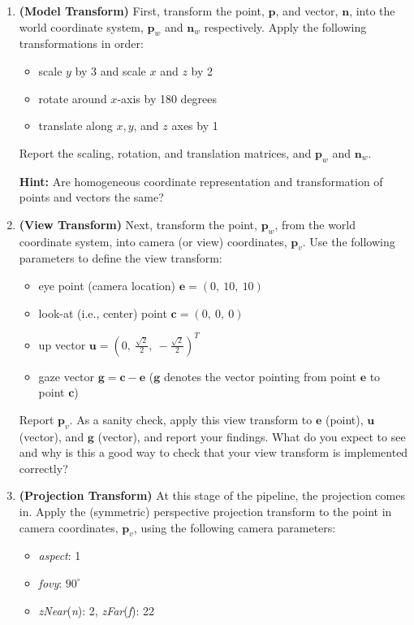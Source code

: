 \documentclass[conference]{styles/acmsiggraph}
\renewcommand{\vec}[1]{\mathbf{#1}}
\newcommand{\pointsin}[1]{\normalfont{(\textit{#1pts})}}
\begin{document}
\begin{enumerate}[label=(\roman*)]
	\itemsep1em 
	\item \textbf{(Model Transform)} First, transform the point, $\vec{p}$, and vector, $\vec{n}$, into the world coordinate system, $\vec{p}_{w}$ and $\vec{n}_{w}$ respectively. Apply the following transformations in order:
	\begin{itemize}
		\item scale $y$ by 3 and scale $x$ and $z$ by 2
		\item rotate around $x$-axis by 180 degrees
		\item translate along $x, y$, and $z$ axes by 1
	\end{itemize}
	Report the scaling, rotation, and translation matrices, and $\vec{p}_{w}$ and $\vec{n}_{w}$. \pointsin{5}
	
	\textbf{Hint:} Are homogeneous coordinate representation and transformation of points and vectors the same?
	
	\item \textbf{(View Transform)} Next, transform the point, $\vec{p}_{w}$, from the world coordinate system, into camera (or view) coordinates, $\vec{p}_{v}$. Use the following parameters to define the view transform:
	
	\begin{itemize}
		\item eye point (camera location) $\vec{e} = (0,\ 10,\ 10)$
		\item look-at (i.e., center) point $\vec{c} = (0,\ 0,\ 0)$
		\item up vector $\vec{u} = (0,\ \frac{\sqrt{2}}{2},\ -\frac{\sqrt{2}}{2})^T$
		\item gaze vector $\vec{g} = \vec{c}-\vec{e}$ ($\vec{g}$ denotes the vector pointing from point $\vec{e}$ to point $\vec{c}$)
	\end{itemize}
	Report $\vec{p}_{v}$. As a sanity check, apply this view transform to $\vec{e}$ (point), $\vec{u}$ (vector), and $\vec{g}$ (vector), and report your findings. What do you expect to see and why is this a good way to check that your view transform is implemented correctly? \pointsin{5}
	
	\item \textbf{(Projection Transform)} At this stage of the pipeline, the projection comes in. Apply the (symmetric) perspective projection transform to the point in camera coordinates, $\vec{p}_{v}$, using the following camera parameters:
	\begin{itemize}
		\item \textit{aspect}: 1
		\item \textit{fovy}: $90^\circ$
		\item \textit{zNear}(\textit{n}): 2, \textit{zFar}(\textit{f}): 22
	\end{itemize}
	

\end{enumerate}
\end{document}

